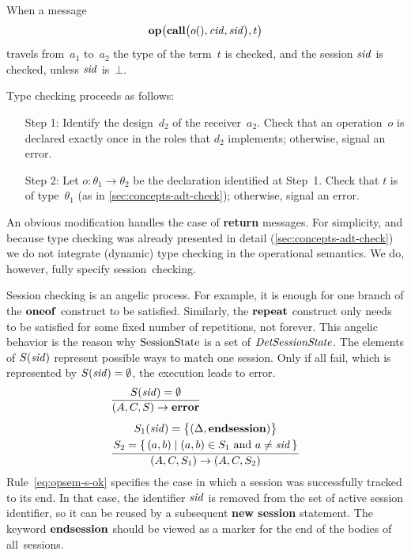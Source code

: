 \documentclass[a4paper,12pt,oneside,fleqn]{book} %
\newcommand{\on}[2]{\genfrac{}{}{0pt}{0}{\strut#1}{\strut#2}}
\begin{document}
{When a message
\begin{align}
{\bf op}\bigl({\bf call}\bigl(o(), {\it cid}, {\it sid}\bigr), t\bigr)
\end{align}
travels from~$a_1$ to~$a_2$ the type of the term~$t$ is checked, and the
session $\it sid$ is checked, unless $\it sid$ is~$\bot$.

Type checking proceeds as follows:
\begin{itemize}
\item[Step 1:]
  Identify the design~$d_2$ of the receiver~$a_2$. Check that an
  operation~$o$ is declared exactly once in the roles that $d_2$
  implements; otherwise, signal an error.
\item[Step 2:]
  Let $o:\theta_1\to\theta_2$ be the declaration identified at Step~1.
  Check that $t$ is of type~$\theta_1$ (as in
  \autoref{sec:concepts-adt-check}); otherwise, signal an error.
\end{itemize}
An obvious modification handles the case of {\bf return} messages. For
simplicity, and because type checking was already presented in detail
(\autoref{sec:concepts-adt-check}) we do not integrate (dynamic) type
checking in the operational semantics. We do, however, fully specify
session~checking.

Session checking is an angelic process. For example, it is enough for one
branch of the $\bf oneof$ construct to be satisfied. Similarly, the $\bf
repeat$ construct only needs to be satisfied for some fixed number of
repetitions, not forever. This angelic behavior is the reason why $\rm
SessionState$ is a set of $\it DetSessionState$.  The elements of $S({\it
sid})$ represent possible ways to match one session. Only if all fail,
which is represented by $S({\it sid})=\emptyset$, the execution leads to
error.
\begin{align}
&\frac
  {S({\it sid})=\emptyset}
  {(A,C,S)\to{\bf error}}
\\[1ex]
&\frac
  {\on{S_1({\it sid})=\bigl\{(\Delta,{\bf endsession})\bigr\}}
      {S_2=\{\,(a,b)\mid\text{$(a,b)\in S_1$ and $a\ne{\it sid}$}\,\}}}
  {(A,C,S_1)\to(A,C,S_2)}
  \label{eq:opsem-s-ok}
\end{align}
Rule~\eqref{eq:opsem-s-ok} specifies the case in which a session was
successfully tracked to its end. In that case, the identifier $\it sid$ is
removed from the set of active session identifier, so it can be reused by a
subsequent {\bf new session} statement. The keyword $\bf endsession$ should
be viewed as a marker for the end of the bodies of all~sessions.

}
\end{document}
